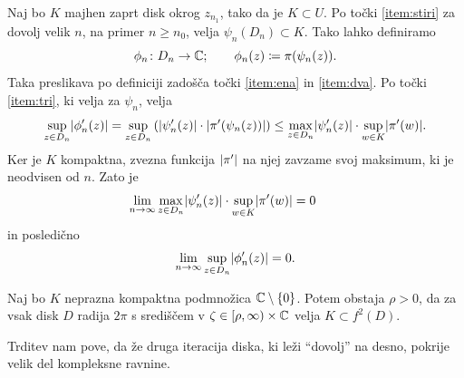\begin{dokaz}
    Naj bo \(K\) majhen zaprt disk okrog \(z_{n_1}\), tako da je \(K \subset U\). Po točki \ref{item:stiri} za dovolj velik \(n\), na primer \(n \geq n_0\), velja \(\psi_n (D_n) \subset K\). Tako lahko definiramo
    \[\phi_n \colon D_n \to \mathbb C; \qquad \phi_n (z) \coloneq \pi (\psi_n (z)).\]
    Taka preslikava po definiciji zadošča točki \ref{item:ena} in \ref{item:dva}. Po točki \ref{item:tri}, ki velja za \(\psi_n\), velja
    \[\sup_{z \in D_n} \lvert\phi_n' (z)\rvert = \sup_{z \in D_n} \left( \lvert\psi_n' (z)\rvert \cdot \lvert\pi' (\psi_n (z))\rvert \right) \leq \max_{z \in D_n} \lvert\psi_n' (z)\rvert \cdot \sup_{w \in K} \lvert\pi' (w)\rvert.\]
    Ker je \(K\) kompaktna, zvezna funkcija \(\lvert\pi'\rvert\) na njej zavzame svoj maksimum, ki je neodvisen od \(n\). Zato je
    \[\lim_{n \to \infty} \max_{z \in D_n} \lvert\psi_n' (z)\rvert \cdot \sup_{w \in K} \lvert\pi' (w)\rvert = 0 \qquad\]
    in posledično
    \[\lim_{n \to \infty} \sup_{z \in D_n} \lvert\phi_n' (z)\rvert = 0.\]
\end{dokaz}

\begin{trditev} \label{prop:large_disks}
    Naj bo \(K\) neprazna kompaktna podmnožica \(\mathbb C \setminus \left\{ 0 \right\}\). Potem obstaja \(\rho > 0\), da za vsak disk \(D\) radija \(2 \pi\) s središčem v \(\zeta \in [\rho, \infty) \times \mathbb C\) velja \(K \subset f^2 (D)\).
\end{trditev}

\noindent Trditev nam pove, da že druga iteracija diska, ki leži ``dovolj'' na desno, pokrije velik del kompleksne ravnine.


